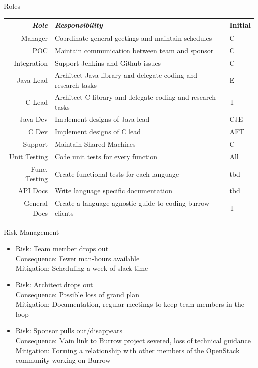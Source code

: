 \documentclass{beamer}
\begin{document}
\begin{frame}{Roles}
  \begin{center}
    {\footnotesize
      \begin{tabular*}{.966\linewidth}{| r | p{7.7cm} | l |}
        \hline
        \emph{Role} & \emph{Responsibility} & Initial\\ \hline \hline
        Manager & Coordinate general geetings and maintain schedules & C\\ \hline
        POC & Maintain communication between team and sponsor & C\\ \hline
        Integration & Support Jenkins and Github issues & C\\ \hline 
        Java Lead & Architect Java library and delegate coding and research tasks & E\\ \hline
        C Lead & Architect C library and delegate coding and research tasks & T\\ \hline
        Java Dev & Implement designs of Java lead & CJE\\ \hline
        C Dev & Implement designs of C lead & AFT\\ \hline
        Support & Maintain Shared Machines & C\\ \hline
        Unit Testing & Code unit tests for every function & All\\ \hline
        Func. Testing & Create functional tests for each language & tbd \\ \hline
        API Docs & Write language specific documentation & tbd \\ \hline
        General Docs & Create a language agnostic guide to coding burrow clients & T\\ \hline
    \end{tabular*}
    }
  \end{center}
\end{frame}

\begin{frame}{Risk Management}
  \begin{itemize}
  \item Risk: Team member drops out\\
    Consequence: Fewer man-hours available\\
    Mitigation: Scheduling a week of slack time
  \item Risk: Architect drops out\\
    Consequence: Possible loss of grand plan\\
    Mitigation: Documentation, regular meetings to keep team members in the loop
  \item Risk: Sponsor pulls out/disappears\\
    Consequence: Main link to Burrow project severed, loss of technical guidance\\
    Mitigation: Forming a relationship with other members of the OpenStack community working on Burrow
    

  \end{itemize}
\end{frame}
\end{document}
